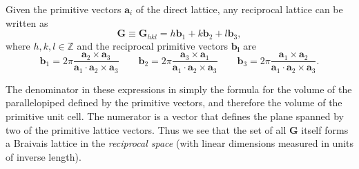 Given the primitive vectors $\mathbf{a}_i$ of the direct lattice, any reciprocal lattice can be written as
\begin{equation}
\mathbf{G} \equiv \mathbf{G}_{hkl}  = h \mathbf{b}_1 + k \mathbf{b}_2 + l \mathbf{b}_3,
\end{equation}
where $h,k,l \in \mathds{Z}$ and the reciprocal primitive vectors $\mathbf{b_i}$ are
\begin{equation}
\mathbf{b}_1 = 2 \pi \frac{\mathbf{a}_2 \times \mathbf{a}_3}{\mathbf{a}_1 \cdot \mathbf{a}_2 \times \mathbf{a}_3} \qquad
\mathbf{b}_2 = 2 \pi \frac{\mathbf{a}_3 \times \mathbf{a}_1}{\mathbf{a}_1 \cdot \mathbf{a}_2 \times \mathbf{a}_3} \qquad
\mathbf{b}_3 = 2 \pi \frac{\mathbf{a}_1 \times \mathbf{a}_2}{\mathbf{a}_1 \cdot \mathbf{a}_2 \times \mathbf{a}_3}.
\end{equation}

The denominator in these expressions in simply the formula for the volume of the parallelopiped defined by the primitive vectors, and therefore the volume of the primitive unit cell. The numerator is a vector that defines the plane spanned by two of the primitive lattice vectors. Thus we see that the set of all $\mathbf{G}$ itself forms a Braivais lattice in the \emph{reciprocal space} (with linear dimensions measured in units of inverse length).

